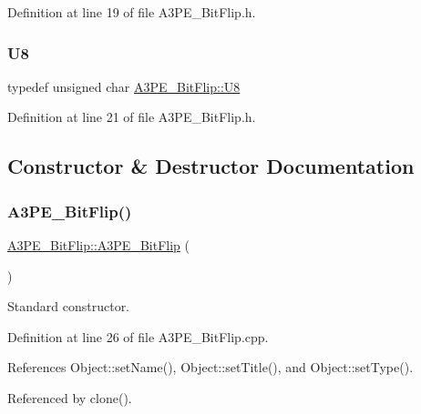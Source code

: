 Definition at line 19 of file A3\+P\+E\+\_\+\+Bit\+Flip.\+h.

\mbox{\label{classA3PE__BitFlip_ac561e6bbd8d4101ecc32016314a07581}} 
\subsubsection{\texorpdfstring{U8}{U8}}
{\footnotesize\ttfamily typedef unsigned char \hyperlink{classA3PE__BitFlip_ac561e6bbd8d4101ecc32016314a07581}{A3\+P\+E\+\_\+\+Bit\+Flip\+::\+U8}}



Definition at line 21 of file A3\+P\+E\+\_\+\+Bit\+Flip.\+h.



\subsection{Constructor \& Destructor Documentation}
\mbox{\label{classA3PE__BitFlip_a79aca0cefbd433bfb7f0e0cb6bc7abe1}} 
\subsubsection{\texorpdfstring{A3\+P\+E\+\_\+\+Bit\+Flip()}{A3PE\_BitFlip()}}
{\footnotesize\ttfamily \hyperlink{classA3PE__BitFlip_1_1A3PE__BitFlip}{A3\+P\+E\+\_\+\+Bit\+Flip\+::\+A3\+P\+E\+\_\+\+Bit\+Flip} (\begin{DoxyParamCaption}{ }\end{DoxyParamCaption})}



Standard constructor. 



Definition at line 26 of file A3\+P\+E\+\_\+\+Bit\+Flip.\+cpp.



References Object\+::set\+Name(), Object\+::set\+Title(), and Object\+::set\+Type().



Referenced by clone().


